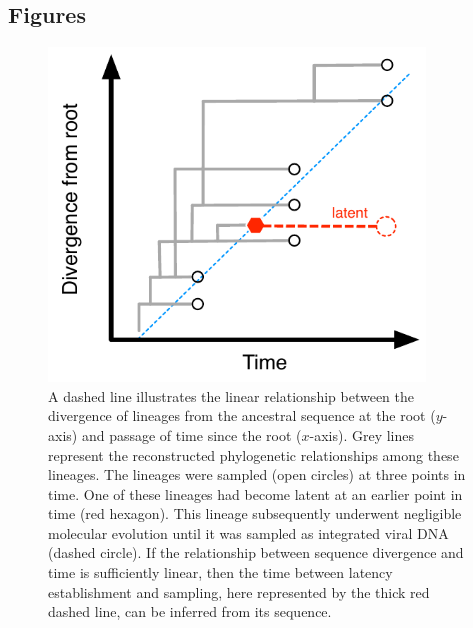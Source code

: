 \documentclass{bmcart}
\begin{document}
\begin{backmatter}







\section * {Figures}

\begin{figure}[h!]
	\centering
	\includegraphics[width=10cm]{latency-scheme}
	\caption{%
	A dashed line illustrates the linear relationship between the divergence of lineages from the ancestral sequence at the root ($y$-axis) and passage of time since the root ($x$-axis).
	Grey lines represent the reconstructed phylogenetic relationships among these lineages.
	The lineages were sampled (open circles) at three points in time.
	One of these lineages had become latent at an earlier point in time (red hexagon).
	This lineage subsequently underwent negligible molecular evolution until it was sampled as integrated viral DNA (dashed circle).
	If the relationship between sequence divergence and time is sufficiently linear, then the time between latency establishment and sampling, here represented by the thick red dashed line, can be inferred from its sequence.
	}
	\label{fig:latenttree}
\end{figure}



\end{backmatter}
\end{document}

